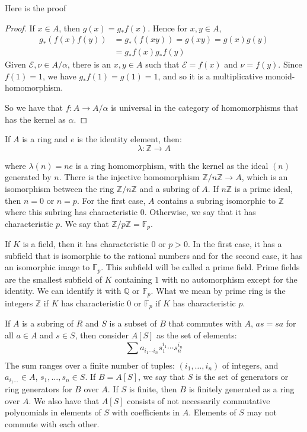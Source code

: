 \documentclass{report}
\begin{document}
Here is the proof
    \begin{proof}
        If $x \in A$, then $g(x) = g_{*}f(x)$. Hence for $x, y \in A$,
            \begin{align*}
                g_{*}(f(x)f(y)) &= g_{*}(f(xy)) = g(xy) = g(x)g(y) \\
                                &= g_{*}f(x)g_{*}f(y)                
            \end{align*}
        Given $\mathcal{E}, \nu \in A/\alpha$, there is an $x, y \in A$ such that $\mathcal{E} = f(x)$ and $\nu = f(y)$. Since $f(1) = 1$, we have $g_{*}f(1) = g(1) = 1$, and so it is a multiplicative monoid-homomorphism.

        So we have that $f: A \rightarrow A/\alpha$ is universal in the category of homomorphisms that has the kernel as $\alpha$. 
    \end{proof}

If $A$ is a ring and $e$ is the identity element, then:
    \begin{equation*}
        \lambda: \mathbb{Z} \rightarrow A
    \end{equation*}

where $\lambda(n) = ne$ is a ring homomorphism, with the kernel as the ideal $(n)$ generated by $n$. There is the injective homomorphism $\mathbb{Z}/n\mathbb{Z} \rightarrow A$, which is an isomorphism between the ring $\mathbb{Z}/n\mathbb{Z}$ and a subring of $A$. If $n \mathbb{Z}$ is a prime ideal, then $n = 0$ or $n = p$. For the first case, $A$ contains a subring isomorphic to $\mathbb{Z}$ where this subring has characteristic $0$. Otherwise, we say that it has characteristic $p$. We say that $\mathbb{Z}/p\mathbb{Z} = \mathbb{F}_{p}$.

If $K$ is a field, then it has characteristic $0$ or $p > 0$. In the first case, it has a subfield that is isomorphic to the rational numbers and for the second case, it has an isomorphic image to $\mathbb{F}_{p}$. This subfield will be called a prime field. Prime fields are the smallest subfield of $K$ containing $1$ with no automorphism except for the identity. We can identify it with $\mathbb{Q}$ or $\mathbb{F}_{p}$. What we mean by prime ring is the integers $\mathbb{Z}$ if $K$ has characteristic $0$ or $\mathbb{F}_{p}$ if $K$ has characteristic $p$.

If $A$ is a subring of $R$ and $S$ is a subset of $B$ that commutes with $A$, $as = sa$ for all $a\in A$ and $s \in S$, then consider $A[S]$ as the set of elements:
    \begin{equation*}
        \sum_{}^{} a_{i_{1} \cdots i_{n}}s_{1}^{i_{1}}\cdots s_{n}^{i_{n}}
    \end{equation*}
The sum ranges over a finite number of tuples: $(i_{1}, \ldots, i_{n})$ of integers, and $a_{i_{1} \ldots} \in A$, $s_{1}, \ldots, s_{n} \in S$. If $B = A[S]$, we say that $S$ is the set of generators or ring generators for $B$ over $A$. If $S$ is finite, then $B$ is finitely generated as a ring over $A$.
 We also have that $A[S]$ consists of not necessarily commutative polynomials in elements of $S$ with coefficients in $A$. Elements of $S$ may not commute with each other.
\end{document}
